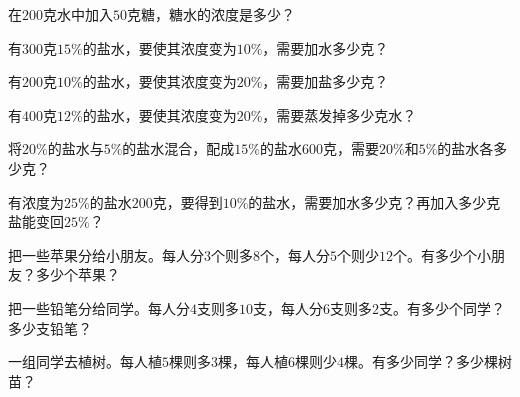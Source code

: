\documentclass[a4paper,12pt]{ctexart}
\begin{document}
\newpage



\begin{exercise}
\item 在$200$克水中加入$50$克糖，糖水的浓度是多少？

\item 有$300$克$15\%$的盐水，要使其浓度变为$10\%$，需要加水多少克？

\item 有$200$克$10\%$的盐水，要使其浓度变为$20\%$，需要加盐多少克？

\item 有$400$克$12\%$的盐水，要使其浓度变为$20\%$，需要蒸发掉多少克水？

\item 将$20\%$的盐水与$5\%$的盐水混合，配成$15\%$的盐水$600$克，需要$20\%$和$5\%$的盐水各多少克？

\item 有浓度为$25\%$的盐水$200$克，要得到$10\%$的盐水，需要加水多少克？再加入多少克盐能变回$25\%$？
\end{exercise}

\newpage



\begin{exercise}
\item 把一些苹果分给小朋友。每人分$3$个则多$8$个，每人分$5$个则少$12$个。有多少个小朋友？多少个苹果？

\item 把一些铅笔分给同学。每人分$4$支则多$10$支，每人分$6$支则多$2$支。有多少个同学？多少支铅笔？

\item 一组同学去植树。每人植$5$棵则多$3$棵，每人植$6$棵则少$4$棵。有多少同学？多少棵树苗？
\end{exercise}
\end{document}
